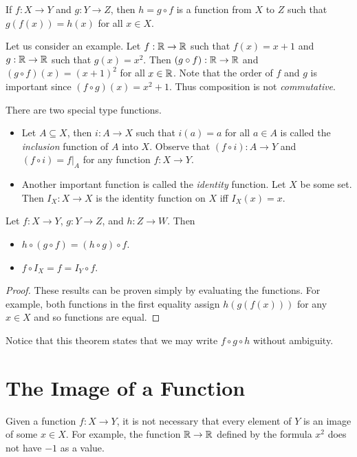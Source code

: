 \begin{definition}
    If $f : X \to Y$ and $g : Y \to Z$, then $h = g \circ f$ is a
    function from $X$ to $Z$ such that $g(f(x)) = h(x)$ for all $x \in X$.
\end{definition}

Let us consider an example. Let $f : \mathbb{R} \to \mathbb{R}$ such that $f(x) = x + 1$ and
$g : \mathbb{R} \to \mathbb{R}$ such that $g(x) = x^2$. Then $(g \circ f) : \mathbb{R} \to \mathbb{R}$ and
$(g \circ f)(x) = (x + 1)^2$ for all $x \in \mathbb{R}$. Note that the order of $f$ and
$g$ is important since $(f \circ g)(x) = x^2 + 1$. Thus composition is not
\emph{commutative}.

There are two special type functions.
\begin{itemize}
    \item Let $A \subseteq X$, then $i : A \to X$ such that $i(a) = a$ for all
        $a \in A$ is called the \emph{inclusion} function of $A$ into $X$. Observe
        that $(f \circ i) : A \to Y$ and $(f \circ i) = f|_A$
        for any function $f : X \to Y$.
    \item Another important function is called the \emph{identity} function.
        Let $X$ be some set. Then $I_X : X \to X$ is the identity function on $X$
        iff $I_X(x) = x$.
\end{itemize}

\begin{theorem}
    Let $f : X \to Y$, $g : Y \to Z$, and $h : Z \to W$. Then
    \begin{itemize}
        \item $h \circ (g \circ f) = (h \circ g) \circ f$.
        \item $f \circ I_X = f = I_Y \circ f$.
    \end{itemize}
\end{theorem}
\begin{proof}
    These results can be proven simply by evaluating the functions. For example,
    both functions in the first equality assign $h(g(f(x)))$ for any $x \in X$
    and so functions are equal.
\end{proof}
Notice that this theorem states that we may write $f \circ g \circ h$ without
ambiguity.

\section{The Image of a Function}
Given a function $f : X \to Y$, it is not necessary that every element of $Y$
is an image of some $x \in X$. For example, the function $\mathbb{R} \to \mathbb{R}$ defined by
the formula $x^2$ does not have $-1$ as a value.

